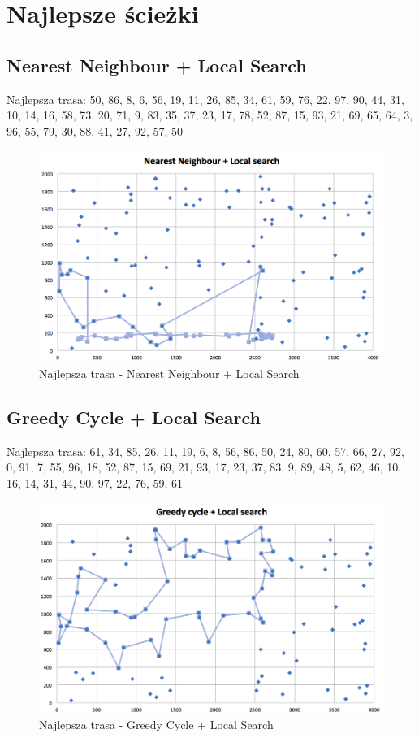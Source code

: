 \documentclass[a4paper 10pt]{article}
\begin{document}
\section{Najlepsze ścieżki}
\subsection{Nearest Neighbour + Local Search}
Najlepsza trasa: 50, 86, 8, 6, 56, 19, 11, 26, 85, 34, 61, 59, 76, 22, 97, 90, 44, 31, 10, 14, 16, 58, 73, 20, 71, 9, 83, 35, 37, 23, 17, 78, 52, 87, 15, 93, 21, 69, 65, 64, 3, 96, 55, 79, 30, 88, 41, 27, 92, 57, 50
\begin{figure} [H]
\centering
\includegraphics[angle=0,width = 1\textwidth, height=!]{images/NN.png}
\caption{Najlepsza trasa - Nearest Neighbour + Local Search}
\label{Rys. NN}
\end{figure}

\newpage
\subsection{Greedy Cycle + Local Search}
Najlepsza trasa: 61, 34, 85, 26, 11, 19, 6, 8, 56, 86, 50, 24, 80, 60, 57, 66, 27, 92, 0, 91, 7, 55, 96, 18, 52, 87, 15, 69, 21, 93, 17, 23, 37, 83, 9, 89, 48, 5, 62, 46, 10, 16, 14, 31, 44, 90, 97, 22, 76, 59, 61 
\begin{figure} [H]
\centering
\includegraphics[angle=0,width = 1\textwidth, height=!]{images/GC.png}
\caption{Najlepsza trasa - Greedy Cycle + Local Search}
\label{Rys. GC}
\end{figure}
\end{document}
